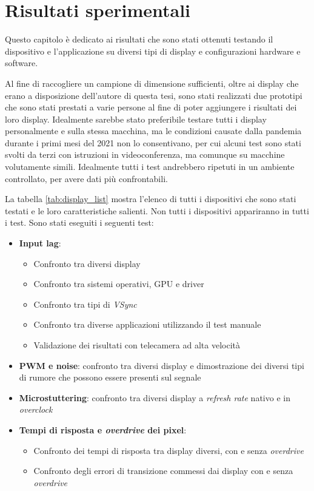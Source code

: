 \chapter{Risultati sperimentali}
\label{chap:expdata}

Questo capitolo è dedicato ai risultati che sono stati ottenuti testando il dispositivo e l'applicazione su diversi tipi di display e configurazioni hardware e software.

Al fine di raccogliere un campione di dimensione sufficienti, oltre ai display che erano a disposizione dell'autore di questa tesi, sono stati realizzati due prototipi che sono stati prestati a varie persone al fine di poter aggiungere i risultati dei loro display. Idealmente sarebbe stato preferibile testare tutti i display personalmente e sulla stessa macchina, ma le condizioni causate dalla pandemia durante i primi mesi del 2021 non lo consentivano, per cui alcuni test sono stati svolti da terzi con istruzioni in videoconferenza, ma comunque su macchine volutamente simili. Idealmente tutti i test andrebbero ripetuti in un ambiente controllato, per avere dati più confrontabili.

La tabella \ref{tab:display_list} mostra l'elenco di tutti i dispositivi che sono stati testati e le loro caratteristiche salienti. Non tutti i dispositivi appariranno in tutti i test. Sono stati eseguiti i seguenti test:\begin{itemize}
	\item \textbf{Input lag}:\begin{itemize}
		\item Confronto tra diversi display
		\item Confronto tra sistemi operativi, GPU e driver
		\item Confronto tra tipi di \textit{VSync}
		\item Confronto tra diverse applicazioni utilizzando il test manuale
		\item Validazione dei risultati con telecamera ad alta velocità
	\end{itemize}
	\item \textbf{PWM e noise}: confronto tra diversi display e dimostrazione dei diversi tipi di rumore che possono essere presenti sul segnale
	\item \textbf{Microstuttering}: confronto tra diversi display a \textit{refresh rate} nativo e in \textit{overclock}
	\item \textbf{Tempi di risposta e \textit{overdrive} dei pixel}:\begin{itemize}
		\item Confronto dei tempi di risposta tra display diversi, con e senza \textit{overdrive}
		\item Confronto degli errori di transizione commessi dai display con e senza \textit{overdrive}
	\end{itemize}
\end{itemize}

